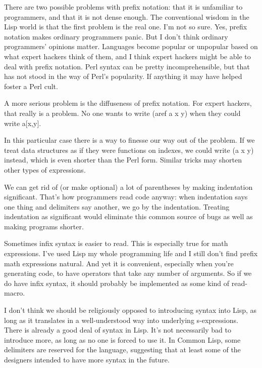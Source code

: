 There are two possible problems
                  with prefix notation: that it is unfamiliar to programmers,
                  and that it is not dense enough. The conventional wisdom in
                  the Lisp world is that the first problem is the real one. I'm
                  not so sure. Yes, prefix notation makes ordinary programmers
                  panic. But I don't think ordinary programmers' opinions
                  matter. Languages become popular or unpopular based on what
                  expert hackers think of them, and I think expert hackers might
                  be able to deal with prefix notation. Perl syntax can be
                  pretty incomprehensible, but that has not stood in the way of
                  Perl's popularity. If anything it may have helped foster a
                  Perl cult.

A more serious problem is the
                  diffuseness of prefix notation. For expert hackers, that
                  really is a problem. No one wants to write (aref a x y) when
                  they could write a[x,y].

In this particular case
                  there is a way to finesse our way out of the problem. If we
                  treat data structures as if they were functions on indexes, we
                  could write (a x y) instead, which is even shorter than the
                  Perl form. Similar tricks may shorten other types of
                  expressions.

We can get rid of (or make optional) a
                  lot of parentheses by making indentation significant. That's
                  how programmers read code anyway: when indentation says one
                  thing and delimiters say another, we go by the indentation.
                  Treating indentation as significant would eliminate this
                  common source of bugs as well as making programs shorter.

Sometimes
                  infix syntax is easier to read. This is especially true for
                  math expressions. I've used Lisp my whole programming life and
                  I still don't find prefix math expressions natural. And yet it
                  is convenient, especially when you're generating code, to have
                  operators that take any number of arguments. So if we do have
                  infix syntax, it should probably be implemented as some kind
                  of read-macro.

I don't think we should be
                  religiously opposed to introducing syntax into Lisp, as long
                  as it translates in a well-understood way into underlying
                  s-expressions. There is already a good deal of syntax in Lisp.
                  It's not necessarily bad to introduce more, as long as no one
                  is forced to use it. In Common Lisp, some delimiters are
                  reserved for the language, suggesting that at least some of
                  the designers intended to have more syntax in the future.

